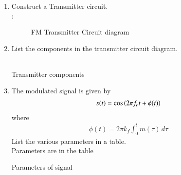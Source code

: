 \begin{enumerate}[label=\arabic*.,ref=\thesection.\theenumi]
\item Construct a Transmitter circuit.
\\
\solution:
\begin{figure}[H]
\centering
  
  \caption{FM Transmitter Circuit diagram}
  \label{ckt:circuit_2}
\end{figure}
\item List the components in the transmitter circuit diagram.\\
\solution \\
\begin{table}[!ht]
  \centering
  
  \caption{Transmitter components}
  \label{tab:tab_2}
\end{table}
\item The modulated signal is given by 
\begin{align}
	s(t) = \cos\left(2\pi f_c t + \phi(t)\right)
\end{align}
where
\begin{align}
	\phi(t) = 2\pi k_f \int_{0}^{t}m(\tau)\,d\tau
	\label{4.2.2.2}
\end{align}
List the various parameters in a table.
\\
\solution
Parameters are in the table 
\vspace{10mm}
\begin{table}[!ht]
  \centering
  
  \caption{Parameters of signal}
  \label{tab:tab_1}
\end{table}


\end{enumerate}
